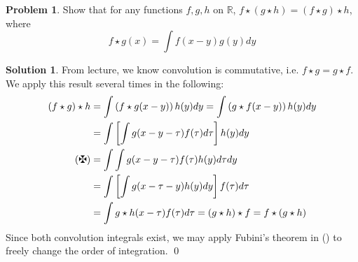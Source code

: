 \documentclass[10pt]{article}
\theoremstyle{plain}
\theoremstyle{definition}
\newtheorem{prob}{Problem}
\newtheorem*{soln*}{Solution}
\providecommand{\R}{\mathbb{R}}%
\numberwithin{equation}{section}
\begin{document}
\hrulefill

\begin{prob}
Show that for any functions $f,g,h$ on $\R$, $f\star (g \star h) = (f\star g) \star h$, where
\[
        f \star g(x) = \int f(x-y) g(y) dy
    \]
\end{prob}

\begin{soln*}
    From lecture, we know convolution is commutative, i.e. $f\star g = g \star f$.
    We apply this result several times in the following:
    \begin{align*}
        (f \star g ) \star h
        &= \int \left(f \star g(x-y)\right) h(y) dy = \int \left(g \star f(x-y)\right) h(y) dy \\
        &= \int \left[ \int g(x-y-\tau) f(\tau) d\tau \right] h(y) dy \\ \tag{\textbf{\maltese}}
        &= \int \int g(x-y-\tau) f(\tau) h(y) d\tau dy \\ 
        &= \int \left[ \int g(x-\tau-y) h(y) dy \right]f(\tau) d\tau  \\
        &= \int g\star h(x-\tau) f(\tau) d\tau = (g \star h) \star f = f \star (g \star h)
    \end{align*}
    Since both convolution integrals exist, we may apply Fubini's theorem in
    (\textbf{\maltese}) to freely change the order of integration.
    \qed
\end{soln*}
\end{document}
